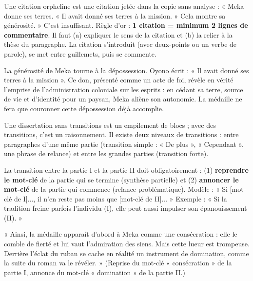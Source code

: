 \documentclass[11pt]{article}
\newcommand{\cle}[1]{{\popxbold\color{popdark}#1}}
\newcounter{popsec}
\newcounter{popsub}
\newcommand{\courssub}[1]{%
  \stepcounter{popsub}%
  \par\vspace{9pt}\noindent{\popxbold\fontsize{11.5}{13}\selectfont\color{popink}{\color{poporange}\thepopsec.\thepopsub}\hspace{6pt}#1}\par\nopagebreak\vspace{4pt}
}
\begin{document}
\begin{attention}
Une citation \cle{orpheline} est une citation jetée dans la copie sans analyse : « Meka donne ses terres. « Il avait donné ses terres à la mission. » Cela montre sa générosité. » C'est insuffisant. Règle d'or : \textbf{1 citation = minimum 2 lignes de commentaire}. Il faut (a) expliquer le sens de la citation et (b) la relier à la thèse du paragraphe. La citation s'introduit (avec deux-points ou un verbe de parole), se met entre guillemets, puis se commente.
\end{attention}

\begin{exemplebox}
La générosité de Meka tourne à la dépossession. Oyono écrit : « Il avait donné ses terres à la mission ». Ce don, présenté comme un acte de foi, révèle en vérité l'emprise de l'administration coloniale sur les esprits : en cédant sa terre, source de vie et d'identité pour un paysan, Meka aliène son autonomie. La médaille ne fera que couronner cette dépossession déjà accomplie.
\end{exemplebox}

\courssub{Les transitions : les coutures du devoir}

Une dissertation sans transitions est un empilement de blocs ; avec des transitions, c'est un raisonnement. Il existe deux niveaux de transitions : entre paragraphes d'une même partie (transition simple : « De plus », « Cependant », une phrase de relance) et entre les grandes parties (transition forte).

\begin{propriete}
La transition entre la partie I et la partie II doit obligatoirement : (1) \textbf{reprendre le mot-clé} de la partie qui se termine (synthèse partielle) et (2) \textbf{annoncer le mot-clé} de la partie qui commence (relance problématique). Modèle : « Si [mot-clé de I]..., il n'en reste pas moins que [mot-clé de II]... » Exemple : « Si la tradition freine parfois l'individu (I), elle peut aussi impulser son épanouissement (II). »
\end{propriete}

\begin{exemplebox}
« Ainsi, la médaille apparaît d'abord à Meka comme une consécration : elle le comble de fierté et lui vaut l'admiration des siens. Mais cette lueur est trompeuse. Derrière l'éclat du ruban se cache en réalité un instrument de domination, comme la suite du roman va le révéler. » (Reprise du mot-clé « consécration » de la partie I, annonce du mot-clé « domination » de la partie II.)
\end{exemplebox}
\end{document}
